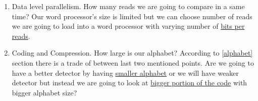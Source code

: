\begin{enumerate}
\item Data level parallelism. How many reads we are going to compare in a same time? Our word processor's size is limited but we can choose number of reads we are going to load into a word processor with varying number of \underline{bits per reads}.
\item Coding and Compression. How large is our alphabet? According to \ref{alphabet} section there is a trade of between last two mentioned points. Are we going to have a better detector by having \underline{smaller alphabet} or we will have weaker detector but instead we are going to look at \underline{bigger portion of the code} with bigger alphabet size?
\end{enumerate}
  
  
  
